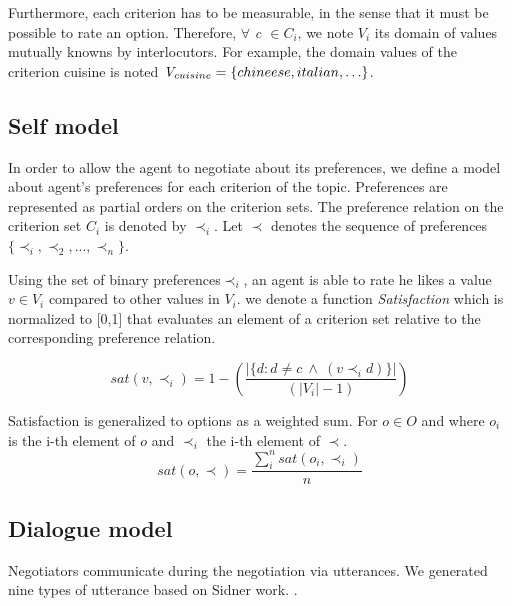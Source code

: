 \documentclass{article}
\begin{document}
	Furthermore, each criterion has to be measurable, in the sense that it must be possible to rate an option. Therefore, $\forall$ \emph{c $\in C_i$},  we note \emph{$V_i$} its  domain of values mutually knowns by interlocutors. For example, the domain values of the criterion cuisine is noted $\emph{V}_{cuisine} = \{chineese, italian, \ldots\}$.
%	
%	
%	
	\subsection{Self model} 
		In order to allow the agent to negotiate about its preferences, we define a model about agent's preferences for each criterion of the topic. Preferences are represented as partial orders on the criterion sets. The preference relation on the criterion set $C_i$ is denoted by $\prec_i$.			
		Let $\prec$ denotes the sequence of preferences $\{ \prec_i, \prec_2, ..., \prec_n\}$.
	
		Using the set of binary preferences$\prec_i$, an agent is able to rate he likes a value $v \in V_i$ compared to other values in $V_i$. we denote a function \emph{Satisfaction} which is normalized to [0,1] that evaluates an element of a criterion set relative to the corresponding preference relation.

	\begin{equation}
	sat(v, \prec_i) =	1 - \left( \frac{|\{d : d \neq c \  \wedge \ (v \prec_i d)\}| }{( |V_i| - 1 )}\right)
	\end{equation}
	
	
	Satisfaction is generalized to options as a weighted sum.
	For $o \in O$ and where $o_i$ is the i-th element of $o$ and $\prec_i$ the i-th element of $\prec$.
	\begin{equation}
	sat(o, \prec) = \frac{\sum_{i}^{n} sat(o_i, \prec_i) }{n}
	\end{equation}
	
	\subsection{Dialogue model}
		Negotiators communicate during the negotiation via utterances. We generated nine types of utterance based on Sidner work. \cite{sidnerartificial}. 
		
\end{document}
